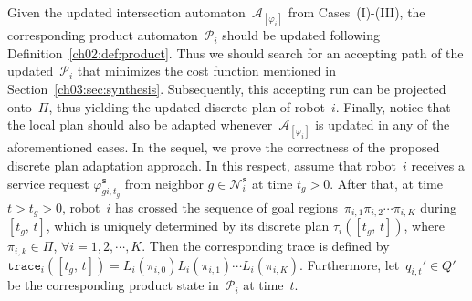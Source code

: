 Given the updated intersection automaton~$\mathcal{A}_{[\varphi_i]}$ from Cases~(I)-(III), the corresponding product automaton~$\mathcal{P}_{i}$ should be updated following Definition~\ref{ch02:def:product}.
Thus we should search for an accepting path of the updated~$\mathcal{P}_{i}$ that minimizes the cost function  mentioned in Section~\ref{ch03:sec:synthesis}.
Subsequently, this accepting run can be projected onto~$\Pi$, thus yielding the updated discrete plan of robot~$i$. Finally, notice that the local plan should also be adapted whenever~$\mathcal{A}_{[\varphi_i]}$ is updated in any of the aforementioned cases.
In the sequel, we prove the correctness of the proposed discrete plan adaptation approach.
In this respect, assume that robot~$i$ receives a service request $\varphi_{gi,t_g}^{\texttt{s}}$ from neighbor $g\in \mathcal{N}_i^{\texttt{s}}$ at time $t_g>0$.
After that, at time~$t>t_g>0$, robot~$i$ has crossed the sequence of goal regions~$\pi_{i,1}\pi_{i,2}\cdots \pi_{i,K}$ during~$[t_g,\, t]$, which is uniquely determined by its discrete plan $\tau_{i}([t_g,\, t])$, where $\pi_{i,k}\in \Pi$, $\forall i=1,2,\cdots,K$.
Then the corresponding trace is defined by $\texttt{trace}_{i}([t_g,\, t])=L_i(\pi_{i,0})L_i(\pi_{i,1})\cdots L_i(\pi_{i,K})$.
Furthermore, let~$q_{i,t}'\in Q'$ be the corresponding product state in~$\mathcal{P}_{i}$ at time~$t$.


